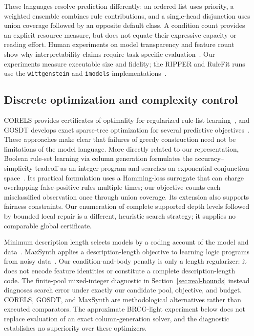 \documentclass[review,12pt]{elsarticle}
\begin{document}
These languages resolve prediction differently: an ordered list uses priority, a weighted ensemble combines rule contributions, and a single-head disjunction uses union coverage followed by an opposite default class. A condition count provides an explicit resource measure, but does not equate their expressive capacity or reading effort. Human experiments on model transparency and feature count show why interpretability claims require task-specific evaluation~\citep{poursabzi2021}. Our experiments measure executable size and fidelity; the RIPPER and RuleFit runs use the \texttt{wittgenstein} and \texttt{imodels} implementations~\citep{wittgenstein,imodels}.

\subsection{Discrete optimization and complexity control}
CORELS provides certificates of optimality for regularized rule-list learning~\citep{angelino2018}, and GOSDT develops exact sparse-tree optimization for several predictive objectives~\citep{lin2020}. These approaches make clear that failures of greedy construction need not be limitations of the model language. More directly related to our representation, Boolean rule-set learning via column generation formulates the accuracy--simplicity tradeoff as an integer program and searches an exponential conjunction space~\citep{dash2018,lawless2023}. Its practical formulation uses a Hamming-loss surrogate that can charge overlapping false-positive rules multiple times; our objective counts each misclassified observation once through union coverage. Its extension also supports fairness constraints. Our enumeration of complete supported depth levels followed by bounded local repair is a different, heuristic search strategy; it supplies no comparable global certificate.

Minimum description length selects models by a coding account of the model and data~\citep{rissanen1978}. MaxSynth applies a description-length objective to learning logic programs from noisy data~\citep{hocquette2024}. Our condition-and-body penalty is only a length regularizer: it does not encode feature identities or constitute a complete description-length code. The finite-pool mixed-integer diagnostic in Section~\ref{sec:real-bounds} instead diagnoses search error under exactly our candidate pool, objective, and budget. CORELS, GOSDT, and MaxSynth are methodological alternatives rather than executed comparators. The approximate BRCG-light experiment below does not replace evaluation of an exact column-generation solver, and the diagnostic establishes no superiority over these optimizers.
\end{document}

